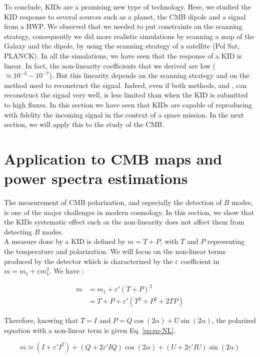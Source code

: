 To conclude, KIDs are a promising new type of technology. Here, we studied the KID response to several sources such as a planet, the CMB dipole and a signal from a HWP. We observed that we needed to put constraints on the scanning strategy, consequently we did more realistic simulations by scanning a map of the Galaxy and the dipole, by using the scanning strategy of a satellite (Pol Sat, PLANCK). In all the simulations, we have seen that the response of a KID is linear. In fact, the non-linearity coefficients that we derived are low (\eps $\simeq 10^{-3} - 10^{-7}$). But this linearity depends on the scanning strategy and on the method used to reconstruct the signal. Indeed, even if both methods, \rf and \cf, can reconstruct the signal very well, \cf is less limited than \rf when the KID is submitted to high fluxes.
In this section we have seen that KIDs are capable of reproducing with fidelity the incoming signal in the context of a space mission. In the next section, we will apply this to the study of the CMB. 

\section{Application to CMB maps and power spectra estimations}
The measurement of CMB polarization, and especially the detection of $B$ modes, is one of the major challenges in modern cosmology. In this section, we show that the KIDs systematic effect such as the non-linearity does not affect them from detecting $B$ modes.\\

A measure done by a KID is defined by $m = T + P$, with $T$ and $P$ representing the temperature and polarization. We will focus on the non-linear terms produced by the detector which is characterized by the $\varepsilon$ coefficient in $ m = m_{1} + \varepsilon m_{1}^{2}$. We have : 

\begin{equation}
\begin{split}
m & = m_{1} +\varepsilon' (T+P)^{2} \\
 & = T + P + \varepsilon'(T^{2} + P^{2} + 2TP) 
\end{split}
\end{equation}

Therefore, knowing that $T=I$ and $P = Q\cos(2\alpha) + U \sin(2\alpha)$, the polarized equation with a non-linear term is given Eq. \ref{eq:eq-NL}.

\begin{equation}
m  \simeq (I + \varepsilon' I^{2}) + (Q + 2\varepsilon' IQ) \cos(2\alpha) + (U + 2 \varepsilon' IU) \sin(2\alpha)
\label{eq:eq-NL}
\end{equation}

